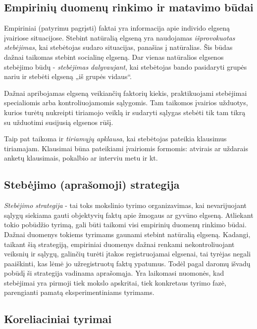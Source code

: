\label{tema:psichologijos_metodai}

\subsection{Empirinių duomenų rinkimo ir matavimo būdai}

Empiriniai (patyrimu pagrįsti) faktai yra informacija apie individo elgseną
įvairiose situacijose. Stebint natūralią elgseną yra naudojamas 
\emph{išprovokuotas stebėjimas}, kai stebėtojas sudaro situacijas, panašias 
į natūralias. Šis būdas dažnai taikomas stebint socialinę elgseną. Dar 
vienas natūralios elgsenos stebėjimo būdų - \emph{stebėjimas dalyvaujant}, 
kai stebėtojas bando pasidaryti grupės nariu ir stebėti elgseną „iš grupės 
vidaus“.

Dažnai apribojamas elgseną veikiančių faktorių kiekis, praktikuojami stebėjimai
specialiomis arba kontroliuojamomis sąlygomis. Tam taikomos įvairios užduotys,
kurios turėtų nukreipti tiriamojo veiklą ir sudaryti sąlygas stebėti tik tam
tikrą su užduotimi susijusią elgsenos rūšį.

Taip pat taikoma ir \emph{tiriamųjų apklausa}, kai stebėtojas pateikia klausimus
tiriamajam. Klausimai būna pateikiami įvairiomis formomis: atvirais ar 
uždarais anketų klausimais, pokalbio ar interviu metu ir kt.

\subsection{Stebėjimo (aprašomoji) strategija}

\emph{Stebėjimo strategija} - tai toks mokslinio tyrimo organizavimas, kai 
nevarijuojant sąlygų siekiama gauti objektyvių faktų apie žmogaus ar gyvūno 
elgseną. Atliekant tokio pobūdžio tyrimą, gali būti taikomi visi empirinių 
duomenų rinkimo būdai. Dažnai duomenys tokiems tyrimams gaunami stebint 
natūralią elgseną. Kadangi, taikant šią strategiją, empiriniai duomenys 
dažnai renkami nekontroliuojant veiksnių ir sąlygų, galinčių turėti įtakos 
registruojamai elgsenai, tai tyrėjas negali paaiškinti, kas lėmė jo 
užregistruotų faktų ypatumus. Todėl pagal daromų išvadų pobūdį ši strategija 
vadinama aprašomąja. Yra laikomasi nuomonės, kad stebėjimai yra pirmoji tiek
mokslo apskritai, tiek konkretaus tyrimo fazė, parengianti pamatą 
eksperimentiniams tyrimams.

\subsection{Koreliaciniai tyrimai}

